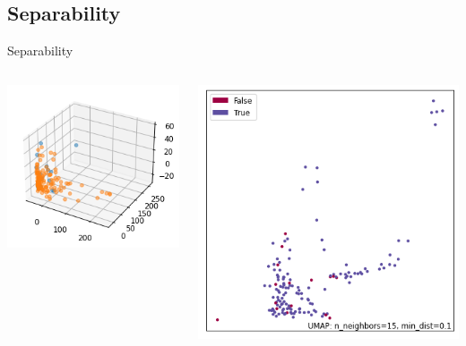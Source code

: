 \documentclass[hyperref={bookmarks=false}]{beamer}
\begin{document}
\subsection{Separability}
\begin{frame}{Separability}
\begin{columns}[c]
    \begin{center}
            \includegraphics[width=\textwidth]{pca.png}
        \end{center}
        \begin{center}
             \includegraphics[width=\textwidth]{umap.png} 
        \end{center}
\end{columns}
\end{frame}
\end{document}
